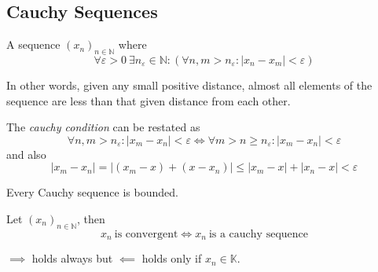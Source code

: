 \subsection{Cauchy Sequences}
\begin{definition}
   A sequence \((x_n)_{n \in \mathbb{N}}\) where
   \[\forall \varepsilon > 0~\exists n_\varepsilon \in \mathbb{N}: (\forall n, m > n_\varepsilon: \lvert x_n - x_m\rvert < \varepsilon)\]
\end{definition}
\begin{remark}[Intuition]
   In other words, given any small positive distance, almost all elements of the sequence are less than that given distance from each other.
\end{remark}
\begin{remark}[Tips]
   The \emph{cauchy condition} can be restated as
   \[\forall n, m > n_\varepsilon: |x_m - x_n| < \varepsilon \iff \forall m > n \geq n_\varepsilon: |x_m - x_n| < \varepsilon\]
   and also
   \[|x_m - x_n| = |(x_m - x) + (x - x_n)| \leq |x_m - x| + |x_n - x| < \varepsilon\]
\end{remark}

\begin{theorem}\label{thm:cauchy_bound}
   Every Cauchy sequence is bounded.
\end{theorem}

\begin{theorem}\label{thm:cauchy_crit_seq}
   Let \((x_n)_{n \in \mathbb{N}}\), then
   \[x_n~\text{is convergent} \iff x_n~\text{is a cauchy sequence}\]
\end{theorem}
\begin{remark}
   \(\implies\) holds always but \(\impliedby\) holds only if \(x_n \in \mathbb{K}\).
\end{remark}

